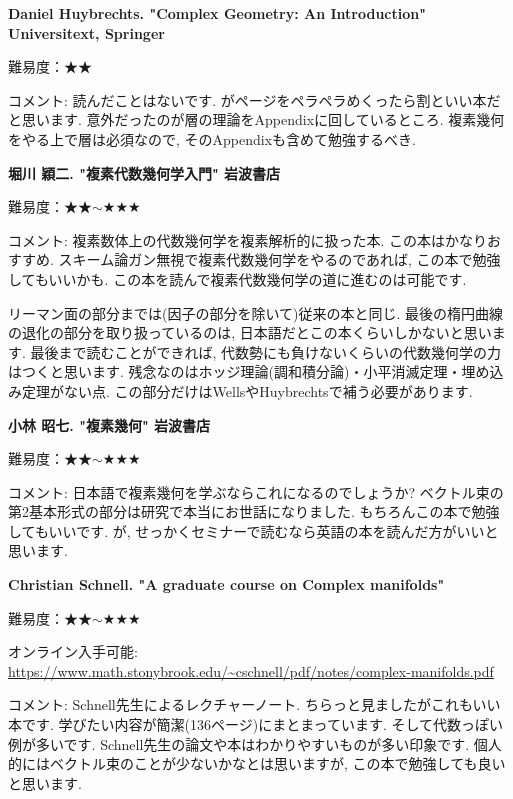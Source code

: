 \textbf{Daniel Huybrechts. "Complex Geometry: An Introduction" Universitext, Springer} \vspace{-6pt}
 
難易度：★★ \vspace{-6pt}

コメント: 読んだことはないです. がページをペラペラめくったら割といい本だと思います. 意外だったのが層の理論をAppendixに回しているところ. 複素幾何をやる上で層は必須なので, そのAppendixも含めて勉強するべき. 
\vspace{8pt}

\textbf{堀川 穎二. "複素代数幾何学入門" 岩波書店}

難易度：★★$\sim$★★★ \vspace{-6pt} 

コメント: 複素数体上の代数幾何学を複素解析的に扱った本. この本はかなりおすすめ. スキーム論ガン無視で複素代数幾何学をやるのであれば, この本で勉強してもいいかも. この本を読んで複素代数幾何学の道に進むのは可能です. 

リーマン面の部分までは(因子の部分を除いて)従来の本と同じ. 最後の楕円曲線の退化の部分を取り扱っているのは, 日本語だとこの本くらいしかないと思います. 最後まで読むことができれば, 代数勢にも負けないくらいの代数幾何学の力はつくと思います. 残念なのはホッジ理論(調和積分論)・小平消滅定理・埋め込み定理がない点.  この部分だけはWellsやHuybrechtsで補う必要があります. 
\vspace{8pt}

\textbf{小林 昭七. "複素幾何" 岩波書店}  \vspace{-6pt} 

難易度：★★$\sim$★★★ \vspace{-6pt} 

コメント: 日本語で複素幾何を学ぶならこれになるのでしょうか? 
ベクトル束の第2基本形式の部分は研究で本当にお世話になりました. 
もちろんこの本で勉強してもいいです.  が, せっかくセミナーで読むなら英語の本を読んだ方がいいと思います. 
\vspace{8pt}

\textbf{Christian Schnell. "A graduate course on Complex manifolds" }  \vspace{-6pt} 

難易度：★★$\sim$★★★ \vspace{-6pt} 

オンライン入手可能: \url{https://www.math.stonybrook.edu/~cschnell/pdf/notes/complex-manifolds.pdf} \vspace{-6pt} 

コメント: Schnell先生によるレクチャーノート. ちらっと見ましたがこれもいい本です. 学びたい内容が簡潔(136ページ)にまとまっています. そして代数っぽい例が多いです. Schnell先生の論文や本はわかりやすいものが多い印象です.
個人的にはベクトル束のことが少ないかなとは思いますが, この本で勉強しても良いと思います.  
 
